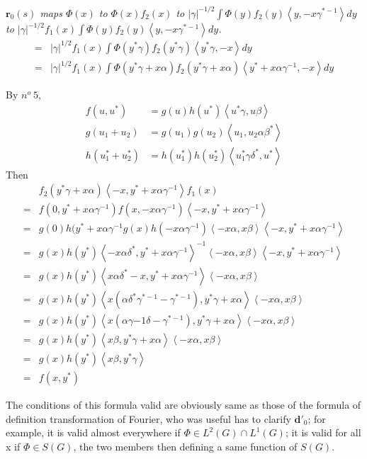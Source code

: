 \documentclass[12pt]{amsart}
\newenvironment{expl}{\it}{\color{black}\normalsize}
\def\bd{{\mathbf{d}}}
\def\br{{\mathbf{r}}}
\def\inn#1#2{\left\langle{#1},{#2}\right\rangle}
\def\abs#1{\left|{#1}\right|}
\begin{document}
\begin{expl}
$\br_0(s)$ maps $\Phi(x)$ to $\Phi(x)f_2(x)$ 
to $\abs{\gamma}^{-1/2}\int \Phi(y) f_2(y)\inn{y}{-x\gamma^{*-1}}dy$
to $\abs{\gamma}^{-1/2}f_1(x)\int \Phi(y) f_2(y)\inn{y}{-x\gamma^{*-1}}dy $.
\[
\begin{split}
=& \abs{\gamma}^{1/2}f_1(x)\int \Phi(y^*\gamma) f_2(y^*\gamma)
\inn{y^*\gamma}{-x}dy \\
=& \abs{\gamma}^{1/2}f_1(x)\int \Phi(y^*\gamma+x\alpha) f_2(y^*\gamma+x\alpha)
\inn{y^*+x\alpha\gamma^{-1}}{-x}dy 
\end{split}
\]

By $n^o~5$,
\begin{align*}
f(u,u^*) &= g(u)h(u^*)\inn{u^*\gamma}{u\beta}\\
g(u_1+u_2) &=g(u_1)g(u_2)\inn{u_1}{u_2\alpha\beta^*}\\
h(u^*_1+u^*_2) &= h(u^*_1)h(u^*_2)\inn{u_1^*\gamma \delta^*}{u^*}
\end{align*}
Then
\[
\begin{split}
& f_2(y^*\gamma + x\alpha)\inn{-x}{y^*+x\alpha\gamma^{-1}}f_1(x)\\
=&f(0,y^*+x\alpha\gamma^{-1})f(x,-x\alpha\gamma^{-1})
\inn{-x}{y^*+x\alpha\gamma^{-1}}\\
=&g(0)h(y^*+x\alpha\gamma^{-1}g(x)h(-x\alpha\gamma^{-1})\inn{-x\alpha}{x\beta}
\inn{-x}{y^*+x\alpha\gamma^{-1}}\\
=&g(x)h(y^*)\inn{-x\alpha\delta^*}{y^*+x\alpha\gamma^{-1}}^{-1}
\inn{-x\alpha}{x\beta}\inn{-x}{y^*+x\alpha\gamma^{-1}}\\
=&g(x)h(y^*)\inn{x\alpha\delta^*-x}{y^*+x\alpha\gamma^{-1}}
\inn{-x\alpha}{x\beta}\\
=&g(x)h(y^*)\inn{x(\alpha\delta^*\gamma^{*-1}-\gamma^{*-1})}{y^*\gamma+x\alpha}
\inn{-x\alpha}{x\beta}\\
=&g(x)h(y^*)\inn{x(\alpha\gamma{-1}\delta-\gamma^{*-1})}{y^*\gamma+x\alpha}
\inn{-x\alpha}{x\beta}\\
=&g(x)h(y^*)\inn{x\beta}{y^*\gamma+x\alpha}
\inn{-x\alpha}{x\beta}\\
=&g(x)h(y^*)\inn{x\beta}{y^*\gamma}\\
=&f(x,y^*)
\end{split}
\]
\end{expl}

The conditions of this formula valid are obviously same as 
those of the formula of  definition transformation of Fourier, 
who was useful has to clarify $\bd'_0$; 
for example, 
it is valid almost everywhere if $\Phi\in L^2(G)\cap L^1(G)$;
it is valid for all x if $\Phi\in S(G)$,
the two members then defining a same function of $S(G)$.
\end{document}
